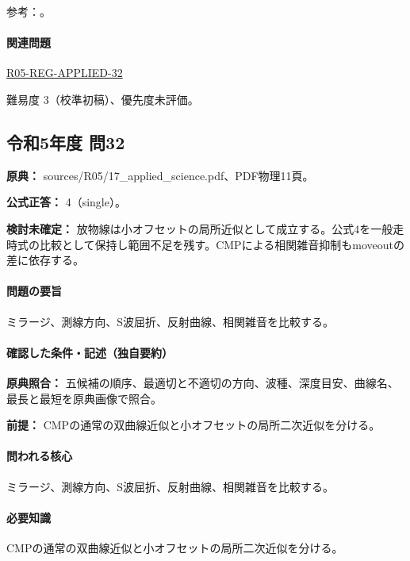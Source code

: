 \par 参考：\cite{epa_seismic_reflection,jica_refraction2015,moe_surface2004,epa_surfacewaves}。

\paragraph{関連問題} \hyperref[q:r05-reg-applied-32]{R05-REG-APPLIED-32}

\par 難易度 3（校準初稿）、優先度未評価。

\subsection{令和5年度 問32}
\label{q:r05-reg-applied-32}

\noindent\textbf{原典：} sources/R05/17\_applied\_science.pdf、PDF物理11頁。

\textbf{公式正答：} 4（single）。

\par\textbf{検討未確定：} 放物線は小オフセットの局所近似として成立する。公式4を一般走時式の比較として保持し範囲不足を残す。CMPによる相関雑音抑制もmoveoutの差に依存する。

\paragraph{問題の要旨} ミラージ、測線方向、S波屈折、反射曲線、相関雑音を比較する。

\paragraph{確認した条件・記述（独自要約）}\mbox{}\par

\noindent\textbf{原典照合：} 五候補の順序、最適切と不適切の方向、波種、深度目安、曲線名、最長と最短を原典画像で照合。\par

\noindent\textbf{前提：} CMPの通常の双曲線近似と小オフセットの局所二次近似を分ける。\par

\paragraph{問われる核心} ミラージ、測線方向、S波屈折、反射曲線、相関雑音を比較する。

\paragraph{必要知識} CMPの通常の双曲線近似と小オフセットの局所二次近似を分ける。

